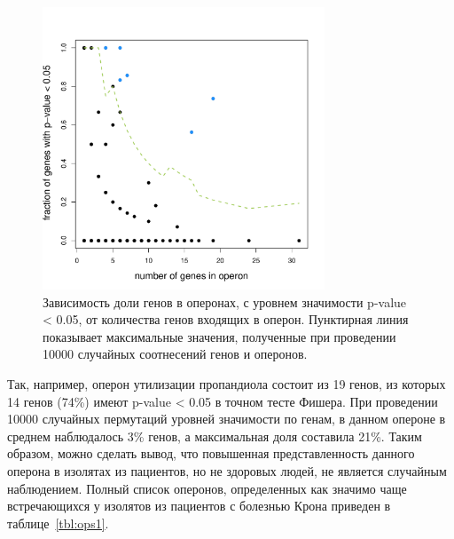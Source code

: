 \begin{figure}[!ht] 
  \center
    \includegraphics [width=0.75\textwidth] {Dissertation/images/operons/statsignificant_operons.pdf}
    \caption{Зависимость доли генов в оперонах, с уровнем значимости p-value < 0.05, от количества генов входящих в оперон. Пунктирная линия показывает максимальные значения, полученные при проведении 10000 случайных соотнесений генов и оперонов.}
    \label{img:operons_shuffle}
\end{figure}

Так, например, оперон утилизации пропандиола состоит из 19 генов, из которых 14 генов (74\%) имеют p-value < 0.05 в точном тесте Фишера. При проведении 10000 случайных пермутаций уровней значимости по генам, в данном опероне в среднем наблюдалось 3\% генов, а максимальная доля составила 21\%. Таким образом, можно сделать вывод, что повышенная представленность данного оперона в изолятах из пациентов, но не здоровых людей, не является случайным наблюдением. Полный список оперонов, определенных как значимо чаще встречающихся у изолятов из пациентов с болезнью Крона приведен в таблице~\ref{tbl:ops1}. 

